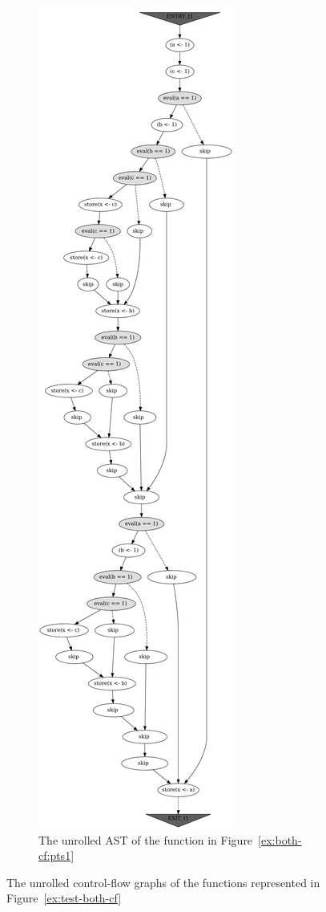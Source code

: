 \begin{figure}[!h]
\begin{subfigure}[b]{.3\textwidth}
  \includegraphics[height=.9\textheight,width=\textwidth]{img/my/graphs/unrolling-comparison/Porthos/t0_unrolled.png}
    \caption{The unrolled AST of the function in Figure~\ref{ex:both-cf:pts1}}
    \hfill
  \label{ex:both-cf:graphU:pts1}
\end{subfigure}
\hfill
%
\caption{The unrolled control-flow graphs of the functions represented in Figure~\ref{ex:test-both-cf}}
\label{ex:test-both-pic-unroll}
\end{figure}

